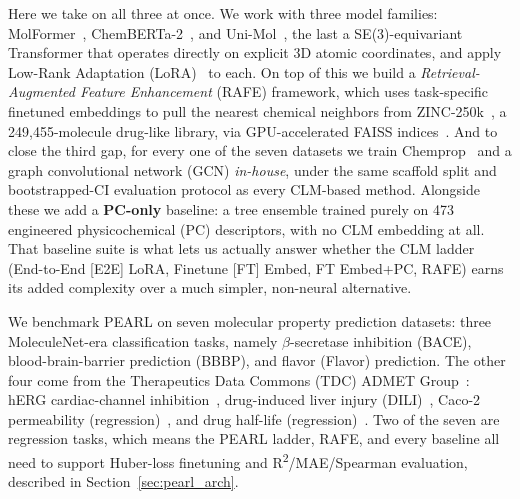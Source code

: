 \documentclass[final,1p,times]{elsarticle}
\begin{document}
Here we take on all three at once. We work with three model families: MolFormer~\cite{ross2022molformer}, ChemBERTa-2~\cite{ahmad2022chemberta2}, and Uni-Mol~\cite{zhou2023unimol}, the last a SE(3)-equivariant Transformer that operates directly on explicit 3D atomic coordinates, and apply Low-Rank Adaptation (LoRA)~\cite{hu2021lora} to each. On top of this we build a \emph{Retrieval-Augmented Feature Enhancement} (RAFE) framework, which uses task-specific finetuned embeddings to pull the nearest chemical neighbors from ZINC-250k~\cite{gomez2018automatic}, a 249,455-molecule drug-like library, via GPU-accelerated FAISS indices~\cite{johnson2021faiss}. And to close the third gap, for every one of the seven datasets we train Chemprop~\cite{yang2019chemprop} and a graph convolutional network (GCN) \emph{in-house}, under the same scaffold split and bootstrapped-CI evaluation protocol as every CLM-based method. Alongside these we add a \textbf{PC-only} baseline: a tree ensemble trained purely on 473 engineered physicochemical (PC) descriptors, with no CLM embedding at all. That baseline suite is what lets us actually answer whether the CLM ladder (End-to-End [E2E] LoRA, Finetune [FT] Embed, FT Embed+PC, RAFE) earns its added complexity over a much simpler, non-neural alternative. %

We benchmark PEARL on seven molecular property prediction datasets: three MoleculeNet-era classification tasks, namely $\beta$-secretase inhibition (BACE), blood-brain-barrier prediction (BBBP), and flavor (Flavor) prediction. The other four come from the Therapeutics Data Commons (TDC) ADMET Group~\cite{huang2021tdc}: hERG cardiac-channel inhibition~\cite{wang2016herg}, drug-induced liver injury (DILI)~\cite{xu2019dili}, Caco-2 permeability (regression)~\cite{wang2016caco2}, and drug half-life (regression)~\cite{obach2008half}. Two of the seven are regression tasks, which means the PEARL ladder, RAFE, and every baseline all need to support Huber-loss finetuning and R\textsuperscript{2}/MAE/Spearman evaluation, described in Section~\ref{sec:pearl_arch}.
\end{document}
